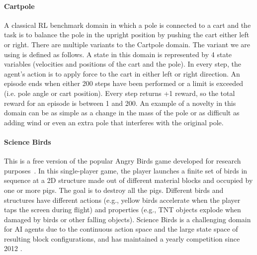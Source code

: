 \documentclass[sigconf]{aamas}
\newcommand{\sbirds}{Science Birds\xspace} %
\begin{document}

\paragraph{Cartpole}
A classical RL benchmark domain in which a pole is connected to a cart and the task is to balance the pole in the upright position by pushing the cart either left or right.
There are multiple variants to the Cartpole domain. The variant we are using is defined as follows.
A state in this domain is represented by 4 state variables (velocities and positions of the cart and the pole).
In every step, the agent's action is to apply force to the cart in either left or right direction. 
An episode ends when either 200 steps have been performed or a limit is exceeded (i.e. pole angle or cart position). %
Every step returns +1 reward, so the total reward for an episode is between 1 and 200. 
An example of a novelty in this domain can be as simple as a change in the mass of the pole or as difficult as adding wind or even an extra pole that interferes with the original pole. 







\paragraph{Science Birds}
This is a free version of the popular Angry Birds game developed for research purposes~\cite{renz2019ai}. 
In this single-player game, the player launches a finite set of birds in sequence
at a 2D structure made out of different material blocks and occupied by one or more pigs. The goal is to destroy all the pigs. 
Different birds and structures have different actions (e.g., yellow birds accelerate when the player taps the screen during flight) and properties (e.g., TNT objects explode when damaged by birds or other falling objects).
\sbirds is a challenging domain for AI agents due to the continuous action space and the large state space of resulting block configurations, and has maintained a yearly competition since 2012 \cite{renz2019ai}.
\end{document}
